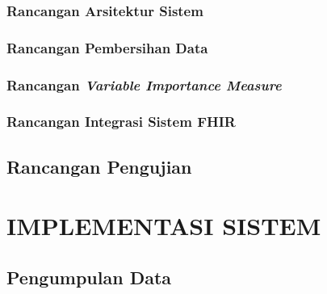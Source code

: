 \documentclass[ugmtesis]{ugmtesis}
\begin{document}
		\subsection{Rancangan Arsitektur Sistem}
		\label{rancangan Arsitektur Sistem}
		

		\subsection{Rancangan Pembersihan Data}
		\label{rancangan pembersihan data}
		

		\subsection{Rancangan \textit{Variable Importance Measure}}
		\label{rancangan variable importance measure}
		

		\subsection{Rancangan Integrasi Sistem FHIR}
		\label{rancangan integrasi sistem fhir}
		

	\section{Rancangan Pengujian}
	\label{rancangan pengujian}
	





\chapter{IMPLEMENTASI SISTEM}
\label{IMPLEMENTASI SISTEM}


	\section{Pengumpulan Data}
	\label{implementasi pengumpulan data}
	
\end{document}
